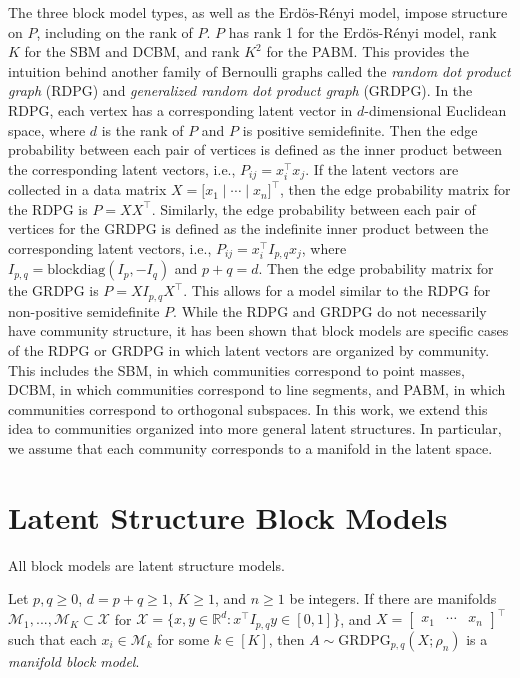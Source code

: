 \documentclass[12pt]{article}
\begin{document}
The three block model types, as well as the
\(\text{Erd\"{o}s-R\'{e}nyi}\) model, impose structure on \(P\),
including on the rank of \(P\). \(P\) has rank 1 for the
\(\text{Erd\"{o}s-R\'{e}nyi}\) model, rank \(K\) for the SBM and DCBM,
and rank \(K^2\) for the PABM. This provides the intuition behind
another family of Bernoulli graphs called the \emph{random dot product
graph} (RDPG) and \emph{generalized random dot product graph} (GRDPG).
In the RDPG, each vertex has a corresponding latent vector in
\(d\)-dimensional Euclidean space, where \(d\) is the rank of \(P\) and
\(P\) is positive semidefinite. Then the edge probability between each
pair of vertices is defined as the inner product between the
corresponding latent vectors, i.e., \(P_{ij} = x_i^\top x_j\). If the
latent vectors are collected in a data matrix
\(X = \bigl[ x_1 \mid \cdots \mid x_n \bigr]^\top\), then the edge
probability matrix for the RDPG is \(P = X X^\top\). Similarly, the edge
probability between each pair of vertices for the GRDPG is defined as
the indefinite inner product between the corresponding latent vectors,
i.e., \(P_{ij} = x_i^\top I_{p,q} x_j\), where
\(I_{p,q} = \mathrm{blockdiag}(I_p, -I_q)\) and \(p + q = d\). Then the
edge probability matrix for the GRDPG is \(P = X I_{p,q} X^\top\). This
allows for a model similar to the RDPG for non-positive semidefinite
\(P\). While the RDPG and GRDPG do not necessarily have community
structure, it has been shown that block models are specific cases of the
RDPG or GRDPG in which latent vectors are organized by community. This
includes the SBM, in which communities correspond to point masses, DCBM,
in which communities correspond to line segments, and PABM, in which
communities correspond to orthogonal subspaces. In this work, we extend
this idea to communities organized into more general latent structures.
In particular, we assume that each community corresponds to a manifold
in the latent space.

\hypertarget{latent-structure-block-models}{%
\section{Latent Structure Block
Models}\label{latent-structure-block-models}}

All block models are latent structure models.

\begin{definition}
Let $p, q \geq 0$, $d = p + q \geq 1$, $K \geq 1$, and $n \geq 1$ be integers.
If there are manifolds $\mathcal{M}_1, ..., \mathcal{M}_K \subset \mathcal{X}$ for $\mathcal{X} = \{x, y \in \mathbb{R}^d : x^\top I_{p,q} y \in [0, 1] \}$, and 
$X = \begin{bmatrix} x_1 & \cdots & x_n \end{bmatrix}^\top$ such that each $x_i \in \mathcal{M}_k$ for some $k \in [K]$, then $A \sim \mathrm{GRDPG}_{p,q}(X; \rho_n)$ is a \emph{manifold block model}.
\end{definition}
\end{document}
